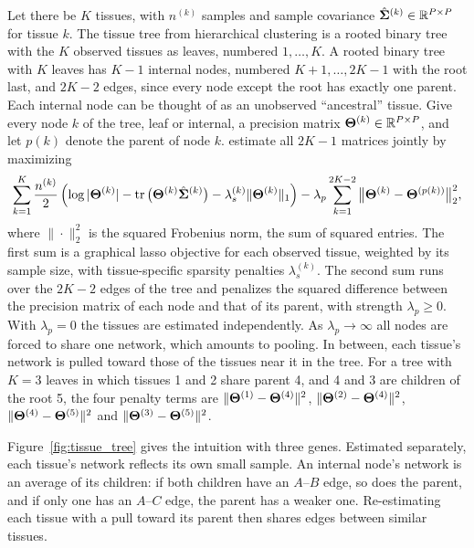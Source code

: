 Let there be $K$ tissues, with $n^{(k)}$ samples and sample covariance $\hat{\boldsymbol{\Sigma}}^{(k)}\in\mathbb{R}^{P\times P}$ for tissue $k$. The tissue tree from hierarchical clustering is a rooted binary tree with the $K$ observed tissues as leaves, numbered $1,\dots,K$. A rooted binary tree with $K$ leaves has $K-1$ internal nodes, numbered $K+1,\dots,2K-1$ with the root last, and $2K-2$ edges, since every node except the root has exactly one parent. Each internal node can be thought of as an unobserved ``ancestral'' tissue. Give every node $k$ of the tree, leaf or internal, a precision matrix $\boldsymbol{\Theta}^{(k)}\in\mathbb{R}^{P\times P}$, and let $p(k)$ denote the parent of node $k$. \citet{pierson2015} estimate all $2K-1$ matrices jointly by maximizing
\begin{equation}
  \sum_{k=1}^{K}\frac{n^{(k)}}{2}\left(\log|\boldsymbol{\Theta}^{(k)}| - \operatorname{tr}\big(\boldsymbol{\Theta}^{(k)}\hat{\boldsymbol{\Sigma}}^{(k)}\big) - \lambda_s^{(k)}\|\boldsymbol{\Theta}^{(k)}\|_1\right)
  - \lambda_p\sum_{k=1}^{2K-2}\big\|\boldsymbol{\Theta}^{(k)}-\boldsymbol{\Theta}^{(p(k))}\big\|_2^2 ,
  \label{eq:gtex_objective}
\end{equation}
where $\|\cdot\|_2^2$ is the squared Frobenius norm, the sum of squared entries. The first sum is a graphical lasso objective for each observed tissue, weighted by its sample size, with tissue-specific sparsity penalties $\lambda_s^{(k)}$. The second sum runs over the $2K-2$ edges of the tree and penalizes the squared difference between the precision matrix of each node and that of its parent, with strength $\lambda_p\ge0$. With $\lambda_p=0$ the tissues are estimated independently. As $\lambda_p\to\infty$ all nodes are forced to share one network, which amounts to pooling. In between, each tissue's network is pulled toward those of the tissues near it in the tree. For a tree with $K=3$ leaves in which tissues 1 and 2 share parent 4, and 4 and 3 are children of the root 5, the four penalty terms are $\|\boldsymbol{\Theta}^{(1)}-\boldsymbol{\Theta}^{(4)}\|^2$, $\|\boldsymbol{\Theta}^{(2)}-\boldsymbol{\Theta}^{(4)}\|^2$, $\|\boldsymbol{\Theta}^{(4)}-\boldsymbol{\Theta}^{(5)}\|^2$ and $\|\boldsymbol{\Theta}^{(3)}-\boldsymbol{\Theta}^{(5)}\|^2$.

Figure~\ref{fig:tissue_tree} gives the intuition with three genes. Estimated separately, each tissue's network reflects its own small sample. An internal node's network is an average of its children: if both children have an $A$--$B$ edge, so does the parent, and if only one has an $A$--$C$ edge, the parent has a weaker one. Re-estimating each tissue with a pull toward its parent then shares edges between similar tissues.

